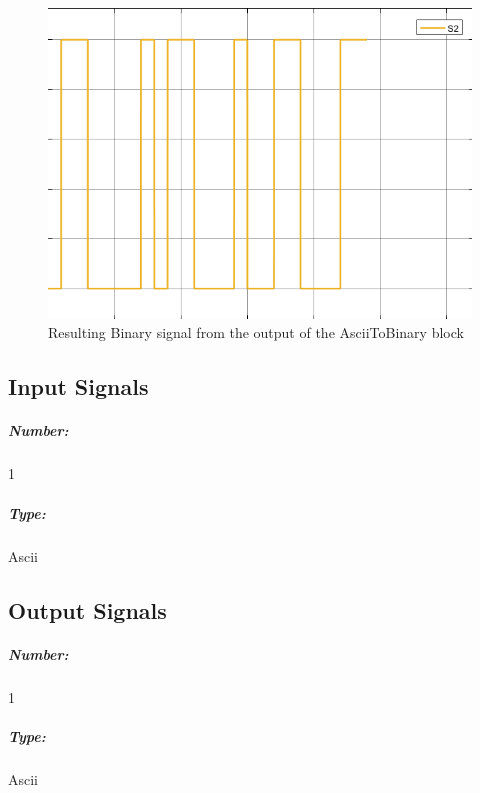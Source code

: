 \begin{figure}[h]
	\centering
\includegraphics[width=.5\linewidth]{./lib/ascii_to_binary/figures/binary_signal.png}
\caption{Resulting Binary signal from the output of the AsciiToBinary block}\label{BinarySignalImage}
\end{figure}
\pagebreak

\subsection*{Input Signals}

\subparagraph*{Number:} 1

\subparagraph*{Type:} Ascii

\subsection*{Output Signals}

\subparagraph*{Number:} 1

\subparagraph*{Type:} Ascii